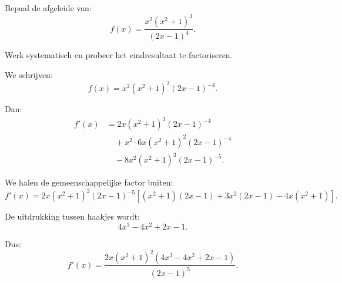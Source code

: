 \documentclass{ximera}
\begin{document}

\begin{oefening}{\oefG}

Bepaal de afgeleide van:
\[
f(x)=\frac{x^2(x^2+1)^3}{(2x-1)^4}.
\]

Werk systematisch en probeer het eindresultaat te factoriseren.

\begin{oplossing}

We schrijven:
\[
f(x)=x^2(x^2+1)^3(2x-1)^{-4}.
\]

Dan:
\[
\begin{aligned}
f'(x)
&=
2x(x^2+1)^3(2x-1)^{-4}\\
&\quad+
x^2\cdot6x(x^2+1)^2(2x-1)^{-4}\\
&\quad-
8x^2(x^2+1)^3(2x-1)^{-5}.
\end{aligned}
\]

We halen de gemeenschappelijke factor buiten:
\[
f'(x)
=
2x(x^2+1)^2(2x-1)^{-5}
\left[
(x^2+1)(2x-1)+3x^2(2x-1)-4x(x^2+1)
\right].
\]

De uitdrukking tussen haakjes wordt:
\[
4x^3-4x^2+2x-1.
\]

Dus:
\[
\boxed{
f'(x)
=
\frac{
2x(x^2+1)^2(4x^3-4x^2+2x-1)
}
{(2x-1)^5}
}.
\]

\end{oplossing}

\end{oefening}


\end{document}
